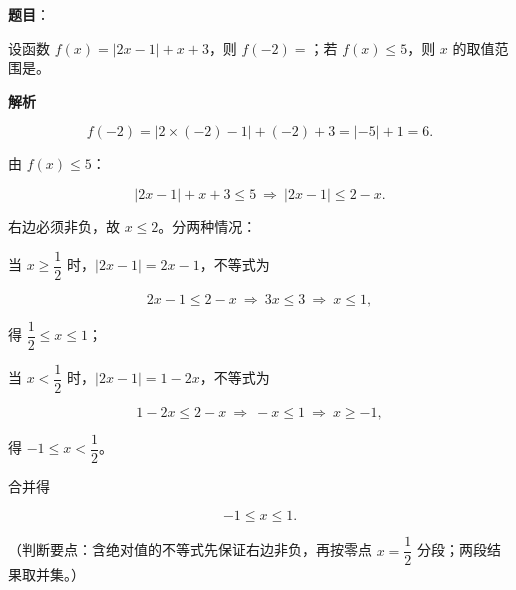 \begin{answer}

\textbf{题目}：

设函数 $f(x)=|2x-1|+x+3$，则 $f(-2)=$\gkblank{}；若 $f(x)\leqslant5$，则 $x$ 的取值范围是\gkblank{}。

\textbf{解析}

\nopagebreak[4]
\[f(-2)=|2\times(-2)-1|+(-2)+3=|-5|+1=6.\]

由 $f(x)\leqslant5$：

\nopagebreak[4]
\[|2x-1|+x+3\leqslant5\ \Rightarrow\ |2x-1|\leqslant2-x.\]

右边必须非负，故 $x\leqslant2$。分两种情况：

当 $x\geqslant\dfrac12$ 时，$|2x-1|=2x-1$，不等式为

\nopagebreak[4]
\[2x-1\leqslant2-x\ \Rightarrow\ 3x\leqslant3\ \Rightarrow\ x\leqslant1,\]

得 $\dfrac12\leqslant x\leqslant1$；

当 $x<\dfrac12$ 时，$|2x-1|=1-2x$，不等式为

\nopagebreak[4]
\[1-2x\leqslant2-x\ \Rightarrow\ -x\leqslant1\ \Rightarrow\ x\geqslant-1,\]

得 $-1\leqslant x<\dfrac12$。

合并得

\nopagebreak[4]
\[-1\leqslant x\leqslant1.\]

（判断要点：含绝对值的不等式先保证右边非负，再按零点 $x=\dfrac12$ 分段；两段结果取并集。）


\end{answer}
